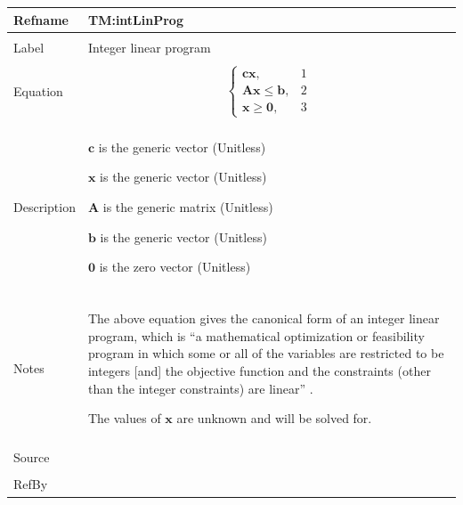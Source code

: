 \documentclass[12pt]{article}
\begin{document}
\vspace{\baselineskip}
\noindent
\begin{minipage}{\textwidth}
\begin{tabular}{>{\raggedright}p{}>{\raggedright\arraybackslash}p{}}
\toprule \textbf{Refname} & \textbf{TM:intLinProg}
\label{TM:intLinProg}
\\ \midrule \\
Label & Integer linear program
        
\\ \midrule \\
Equation & \begin{displaymath}
           \begin{cases}
           \symbf{c} \symbf{x}, & 1\\
           \symbf{A} \symbf{x}\leq{}\symbf{b}, & 2\\
           \symbf{x}\geq{}\symbf{0}, & 3
           \end{cases}
           \end{displaymath}
\\ \midrule \\
Description & \begin{symbDescription}
              \item{$\symbf{c}$ is the generic vector (Unitless)}
              \item{$\symbf{x}$ is the generic vector (Unitless)}
              \item{$\symbf{A}$ is the generic matrix (Unitless)}
              \item{$\symbf{b}$ is the generic vector (Unitless)}
              \item{$\symbf{0}$ is the zero vector (Unitless)}
              \end{symbDescription}
\\ \midrule \\
Notes & The above equation gives the canonical form of an integer linear program, which is ``a mathematical optimization or feasibility program in which some or all of the variables are restricted to be integers [and] the objective function and the constraints (other than the integer constraints) are linear'' \cite{ilpWiki}.
        
        The values of $\symbf{x}$ are unknown and will be solved for.
        
\\ \midrule \\
Source & \cite{ilpWiki}
         
\\ \midrule \\
RefBy & 
\\ \bottomrule
\end{tabular}
\end{minipage}
\end{document}
